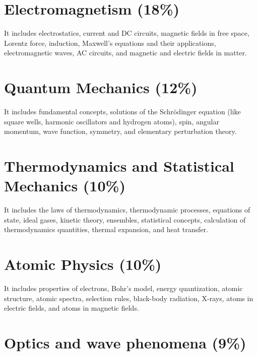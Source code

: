 \documentclass[12pt,a4paper]{article}
\begin{document}
\section{Electromagnetism (18\%)}

\quad It includes electrostatics, current and DC circuits, magnetic fields in free space, Lorentz force, induction, Maxwell's equations and their applications, electromagnetic waves, AC circuits, and magnetic and electric fields in matter.

\section{Quantum Mechanics (12\%)}

\quad It includes fundamental concepts, solutions of the Schr\"{o}dinger equation (like square wells, harmonic oscillators and hydrogen atoms), spin, angular momentum, wave function, symmetry, and elementary perturbation theory.


\section{Thermodynamics and Statistical Mechanics (10\%)}

\quad It includes the laws of thermodynamics, thermodynamic processes, equations of state, ideal gases, kinetic theory, ensembles, statistical concepts, calculation of thermodynamics quantities, thermal expansion, and heat transfer.


\section{Atomic Physics (10\%)}

\quad It includes properties of electrons, Bohr's model, energy quantization, atomic structure, atomic spectra, selection rules, black-body radiation, X-rays, atoms in electric fields, and atoms in magnetic fields.


\section{Optics and wave phenomena (9\%)}
\end{document}
